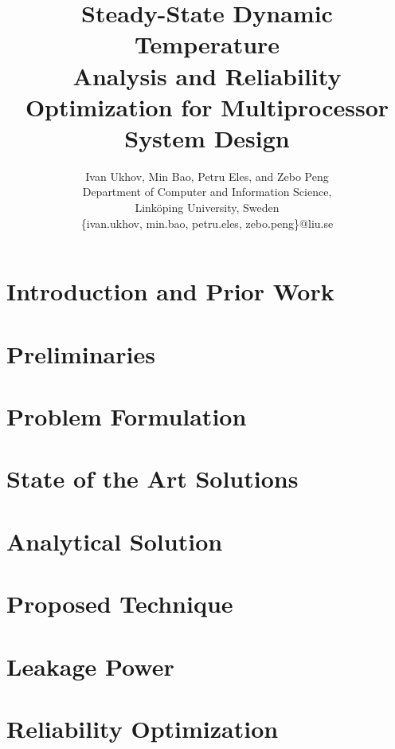 \documentclass[conference]{IEEEtran}
\title{Steady-State Dynamic Temperature \\Analysis and Reliability Optimization for Multiprocessor System Design}
\author{
  Ivan Ukhov, Min Bao, Petru Eles, and Zebo Peng \\
  Department of Computer and Information Science,\\
  Link\"{o}ping University, Sweden \\
  \{ivan.ukhov, min.bao, petru.eles, zebo.peng\}@liu.se
}
\begin{document}
  \maketitle

  \begin{abstract}
    
  \end{abstract}

  \section{Introduction and Prior Work}
  

  \section{Preliminaries} \label{sec:preliminaries}
  

  \section{Problem Formulation} \label{sec:problem}
  

  \section{State of the Art Solutions} \label{sec:hotspot-solution}
  

  \section{Analytical Solution} \label{sec:analytical-solution}
  

  \section{Proposed Technique} \label{sec:condensed-equation}
  

  \section{Leakage Power} \label{sec:leakage}
  

  \section{Reliability Optimization} \label{sec:reliability}
  
\end{document}
